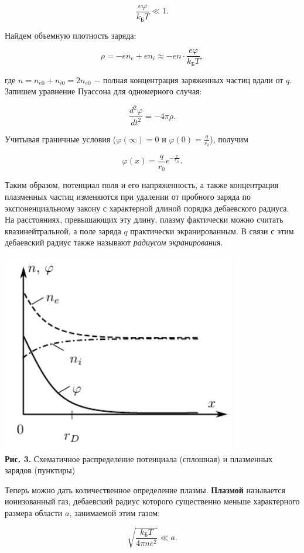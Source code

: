 \documentclass[a4paper,12pt]{article} %
\begin{document}
$$
\frac{e\varphi}{k_\text{Б}T} \ll 1.
$$

\hfill \break Найдем объемную плотность заряда:

$$
\rho = -en_{e}+en_{i} \approx -en \cdot \frac{e\varphi}{k_\text{Б}T},
$$

\hfill \break где $n = n_{e0} + n_{i0} = 2n_{e0}$ $-$ полная концентрация заряженных частиц вдали от $q$. Запишем уравнение Пуассона для одномерного случая:

$$
\frac{d^2\varphi}{dt^2} = -4\pi \rho.
$$

\hfill \break Учитывая граничные условия ($\varphi(\infty) = 0$ и $\varphi(0) = \frac{q}{r_0}$), получим

\begin{equation}\label{ linkname }
\varphi(x) = \frac{q}{r_{0}}e^{-\frac{x}{r_{D}}}.
\end{equation}

\hfill \break Таким образом, потенциал поля и его напряженность, а также концентрация плазменных частиц изменяются при удалении от пробного заряда по экспоненциальному закону с характерной длиной порядка дебаевского радиуса. На расстояниях, превышающих эту длину, плазму фактически можно считать квазинейтральной, а поле заряда $q$ практически экранированным. В связи с этим дебаевский радиус также называют \textit{радиусом экранирования}.

\begin{center}
\includegraphics[width=0.45\linewidth]{3.5.1_3.png}\\
\textbf{Рис. 3.} Схематичное распределение потенциала (сплошная) и плазменных зарядов (пунктиры)\\
\end{center}

\hfill \break Теперь можно дать количественное определение плазмы. \textbf{Плазмой} называется ионизованный газ, дебаевский радиус которого существенно меньше характерного размера области $a$, занимаемой этим газом:

$$
\sqrt{\frac{k_\text{Б}T}{4\pi ne^2}} \ll a.
$$
\end{document}

